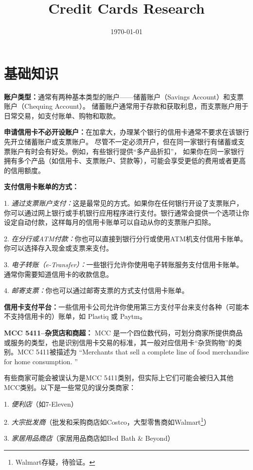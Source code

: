\documentclass{article}
\title{Credit Cards Research}
\date{\today} %
\begin{document}
\maketitle

\section{基础知识}

\textbf{账户类型：}通常有两种基本类型的账户——储蓄账户（Savings Account）和支票账户（Chequing Account）。
储蓄账户通常用于存款和获取利息，而支票账户用于日常交易，如支付账单、购物和取款。

\textbf{申请信用卡不必开设账户：}在加拿大，办理某个银行的信用卡通常不要求在该银行先开立储蓄账户或支票账户。
尽管不一定必须开户，但在同一家银行有储蓄或支票账户有时会有好处。例如，有些银行提供“多产品折扣”，
如果你在同一家银行拥有多个产品（如信用卡、支票账户、贷款等），可能会享受更低的费用或者更高的信用额度。

\textbf{支付信用卡账单的方式：}

1. \emph{通过支票账户支付：}这是最常见的方式。如果你在任何银行开设了支票账户，你可以通过网上银行或手机银行应用程序进行支付。银行通常会提供一个选项让你设定自动付款，这样每月的信用卡账单可以自动从你的支票账户扣除。

2. \emph{在分行或ATM付款：}你也可以直接到银行分行或使用ATM机支付信用卡账单。你可以选择存入现金或支票来支付。

3. \emph{电子转账（e-Transfer）：}一些银行允许你使用电子转账服务支付信用卡账单。通常你需要知道信用卡的收款信息。

4. \emph{邮寄支票：}你也可以通过邮寄支票的方式支付信用卡账单。

\textbf{信用卡支付平台：}一些信用卡公司允许你使用第三方支付平台来支付各种（可能本不支持信用卡的）账单，如 Plastiq 或 Paytm。

\textbf{MCC 5411--杂货店和商超：}
MCC 是一个四位数代码，可划分商家所提供商品或服务的类型，也是识别信用卡交易的标准，其一般对应信用卡“杂货购物”的类别。MCC 5411被描述为
``Merchants that sell a complete line of food merchandise for home consumption. ''

有些商家可能会被误认为是MCC 5411类别，但实际上它们可能会被归入其他MCC类别。以下是一些常见的误分类商家：

1. \emph{便利店}（如7-Eleven）

2. \emph{大宗批发商}（批发和采购商店如Costco，大型零售商如Walmart\footnote{Walmart存疑，待验证。}）

3. \emph{家居用品商店}（家居用品商店如Bed Bath \& Beyond）
\end{document}
